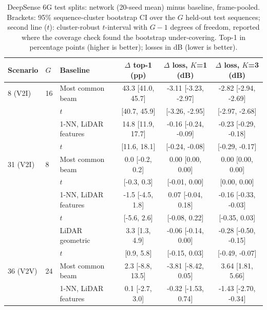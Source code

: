 \begin{table}[t]\centering\caption{DeepSense 6G test splits: network (20-seed mean) minus baseline, frame-pooled. Brackets: 95\% sequence-cluster bootstrap CI over the $G$ held-out test sequences; second line ($t$): cluster-robust $t$-interval with $G-1$ degrees of freedom, reported where the coverage check found the bootstrap under-covering. Top-1 in percentage points (higher is better); losses in dB (lower is better).}\label{tab:realdata_cmp}
\small\begin{tabular}{@{}lllccc@{}}\toprule
Scenario & $G$ & Baseline & $\Delta$ top-1 (pp) & $\Delta$ loss, $K$=1 (dB) & $\Delta$ loss, $K$=3 (dB) \\\midrule
8 (V2I) & 16 & Most common beam & 43.3 [41.0, 45.7] & -3.11 [-3.23, -2.97] & -2.82 [-2.94, -2.69] \\
 & & \quad $t$ & [40.7, 45.9] & [-3.26, -2.95] & [-2.97, -2.68] \\
 &  & 1-NN, LiDAR features & 14.8 [11.9, 17.7] & -0.16 [-0.24, -0.09] & -0.23 [-0.29, -0.18] \\
 & & \quad $t$ & [11.6, 18.1] & [-0.24, -0.08] & [-0.29, -0.17] \\
\midrule
31 (V2I) & 8 & Most common beam & 0.0 [-0.2, 0.2] & 0.00 [0.00, 0.00] & 0.00 [0.00, 0.00] \\
 & & \quad $t$ & [-0.3, 0.3] & [-0.01, 0.00] & [0.00, 0.00] \\
 &  & 1-NN, LiDAR features & -1.5 [-4.5, 1.8] & 0.07 [-0.04, 0.18] & -0.16 [-0.33, -0.03] \\
 & & \quad $t$ & [-5.6, 2.6] & [-0.08, 0.22] & [-0.35, 0.03] \\
 &  & LiDAR geometric & 3.3 [1.3, 4.9] & -0.06 [-0.14, 0.00] & -0.28 [-0.50, -0.15] \\
 & & \quad $t$ & [0.9, 5.8] & [-0.15, 0.03] & [-0.49, -0.07] \\
\midrule
36 (V2V) & 24 & Most common beam & 2.3 [-8.8, 13.5] & -3.81 [-8.42, 0.05] & 3.64 [1.81, 5.66] \\
 &  & 1-NN, LiDAR features & 0.1 [-2.7, 3.0] & -0.32 [-1.53, 0.74] & -1.43 [-2.70, -0.34] \\
\bottomrule\end{tabular}\end{table}
